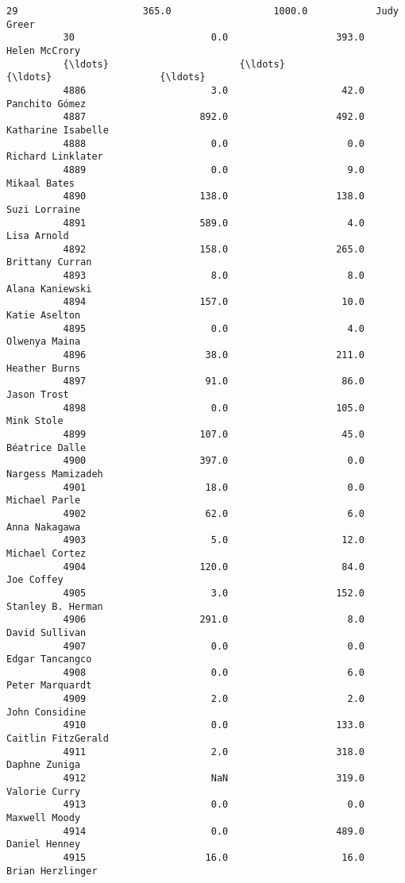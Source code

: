 \documentclass[11pt]{article}
\begin{document}
\begin{Verbatim}[commandchars=\\\{\}]
          29                      365.0                  1000.0            Judy Greer   
          30                        0.0                   393.0         Helen McCrory   
          {\ldots}                       {\ldots}                     {\ldots}                   {\ldots}   
          4886                      3.0                    42.0        Panchito Gómez   
          4887                    892.0                   492.0    Katharine Isabelle   
          4888                      0.0                     0.0     Richard Linklater   
          4889                      0.0                     9.0          Mikaal Bates   
          4890                    138.0                   138.0         Suzi Lorraine   
          4891                    589.0                     4.0           Lisa Arnold   
          4892                    158.0                   265.0       Brittany Curran   
          4893                      8.0                     8.0       Alana Kaniewski   
          4894                    157.0                    10.0         Katie Aselton   
          4895                      0.0                     4.0         Olwenya Maina   
          4896                     38.0                   211.0         Heather Burns   
          4897                     91.0                    86.0           Jason Trost   
          4898                      0.0                   105.0            Mink Stole   
          4899                    107.0                    45.0        Béatrice Dalle   
          4900                    397.0                     0.0     Nargess Mamizadeh   
          4901                     18.0                     0.0         Michael Parle   
          4902                     62.0                     6.0         Anna Nakagawa   
          4903                      5.0                    12.0        Michael Cortez   
          4904                    120.0                    84.0            Joe Coffey   
          4905                      3.0                   152.0     Stanley B. Herman   
          4906                    291.0                     8.0        David Sullivan   
          4907                      0.0                     0.0       Edgar Tancangco   
          4908                      0.0                     6.0       Peter Marquardt   
          4909                      2.0                     2.0        John Considine   
          4910                      0.0                   133.0    Caitlin FitzGerald   
          4911                      2.0                   318.0         Daphne Zuniga   
          4912                      NaN                   319.0         Valorie Curry   
          4913                      0.0                     0.0         Maxwell Moody   
          4914                      0.0                   489.0         Daniel Henney   
          4915                     16.0                    16.0      Brian Herzlinger   
          

\end{Verbatim}
\end{document}
